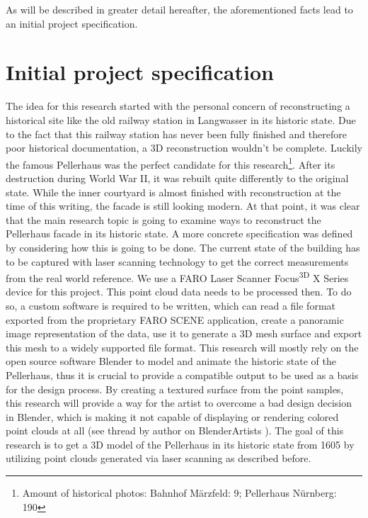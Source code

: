 As will be described in greater detail hereafter, the aforementioned facts lead to an initial project specification. 

\section{Initial project specification}

The idea for this research started with the personal concern of reconstructing a historical site like the old railway station in Langwasser in its historic state. Due to the fact that this railway station has never been fully finished and therefore poor historical documentation, a 3D reconstruction wouldn't be complete. Luckily the famous Pellerhaus was the perfect candidate for this research\footnote{Amount of historical photos: Bahnhof Märzfeld: 9; Pellerhaus Nürnberg: 190}. After its destruction during World War II, it was rebuilt quite differently to the original state. While the inner courtyard is almost finished with reconstruction at the time of this writing, the facade is still looking modern. At that point, it was clear that the main research topic is going to examine ways to reconstruct the Pellerhaus facade in its historic state.
A more concrete specification was defined by considering how this is going to be done. The current state of the building has to be captured with laser scanning technology to get the correct measurements from the real world reference. We use a FARO Laser Scanner Focus\textsuperscript{3D} X Series device for this project.
This point cloud data needs to be processed then. To do so, a custom software is required to be written, which can read a file format exported from the proprietary FARO SCENE application, create a panoramic image representation of the data, use it to generate a 3D mesh surface and export this mesh to a widely supported file format. This research will mostly rely on the open source software Blender to model and animate the historic state of the Pellerhaus, thus it is crucial to provide a compatible output to be used as a basis for the design process. By creating a textured surface from the point samples, this research will provide a way for the artist to overcome a bad design decision in Blender, which is making it not capable of displaying or rendering colored point clouds at all (see thread by author on BlenderArtists \parencite{webBlenderArtistsPointCloudSupport} ). The goal of this research is to get a 3D model of the Pellerhaus in its historic state from 1605 by utilizing point clouds generated via laser scanning as described before.

